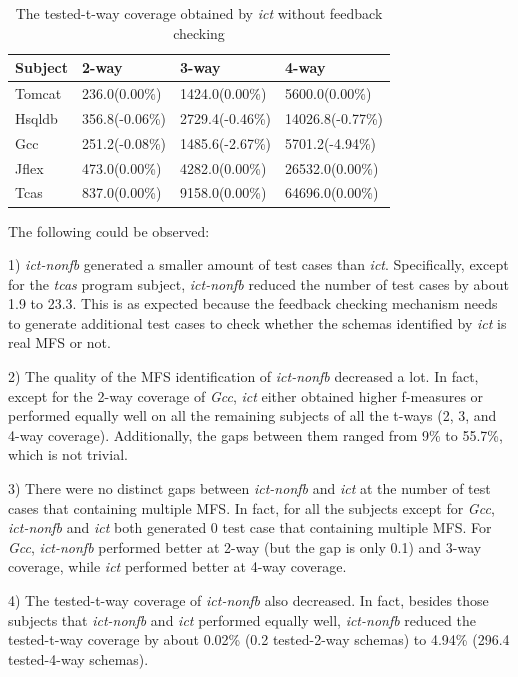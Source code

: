 \documentclass[journal,12pt,onecolumn,draftclsnofoot,]{IEEEtran}
\begin{document}
\begin{table}[ht]
\caption{The tested-t-way coverage obtained by \emph{ict} without feedback checking}
\label{tested-t-way-ict-nonfb}
\centering
    \begin{tabular}{|l|l|l|l|}
    \hline
 Subject      & 2-way                     & 3-way                     & 4-way                       \\ \hline
Tomcat	&236.0(0.00\%)	&1424.0(0.00\%)	&5600.0(0.00\%)	\\
Hsqldb	&356.8(-0.06\%)	&2729.4(-0.46\%)	&14026.8(-0.77\%)	\\
Gcc	&251.2(-0.08\%)	&1485.6(-2.67\%)	&5701.2(-4.94\%)	\\
Jflex	&473.0(0.00\%)	&4282.0(0.00\%)	&26532.0(0.00\%)	\\
Tcas	&837.0(0.00\%)	&9158.0(0.00\%)	&64696.0(0.00\%)	\\\hline
    \end{tabular}
\end{table}

The following could be observed:

1) \emph{ict-nonfb} generated a smaller amount of test cases than \emph{ict}. Specifically, except for the \emph{tcas} program subject, \emph{ict-nonfb} reduced the number of test cases by about 1.9 to 23.3. This is as expected because the feedback checking mechanism needs to generate additional test cases to check whether the schemas identified by \emph{ict} is real MFS or not.

2) The quality of the MFS identification of \emph{ict-nonfb} decreased a lot. In fact, except for the 2-way coverage of \emph{Gcc}, \emph{ict} either obtained higher f-measures or performed equally well on all the remaining subjects of all the t-ways (2, 3, and 4-way coverage). Additionally, the gaps between them ranged from 9\% to 55.7\%, which is not trivial.


3) There were no distinct gaps between \emph{ict-nonfb} and \emph{ict} at the number of test cases that containing multiple MFS. In fact, for all the subjects except for \emph{Gcc}, \emph{ict-nonfb} and \emph{ict} both generated 0 test case that containing multiple MFS. For \emph{Gcc}, \emph{ict-nonfb} performed better at 2-way (but the gap is only 0.1) and 3-way coverage, while \emph{ict} performed better at 4-way coverage.

4) The tested-t-way coverage of \emph{ict-nonfb} also decreased. In fact, besides those subjects that \emph{ict-nonfb} and \emph{ict} performed equally well, \emph{ict-nonfb} reduced the tested-t-way coverage by about 0.02\% (0.2 tested-2-way schemas) to 4.94\% (296.4 tested-4-way schemas).
\end{document}
